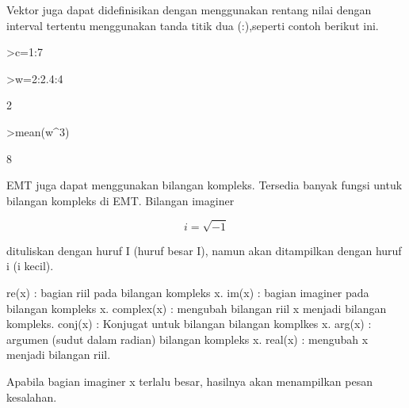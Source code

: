 \documentclass[a4paper,10pt]{article}
\begin{document}
\begin{eulernotebook}
\begin{eulercomment}
\begin{eulercomment}
\begin{eulercomment}
\begin{eulercomment}
\begin{eulercomment}
Vektor juga dapat didefinisikan dengan menggunakan rentang nilai dengan interval
tertentu menggunakan tanda titik dua (:),seperti contoh berikut ini.
\end{eulercomment}
\begin{eulerprompt}
>c=1:7
\end{eulerprompt}
\begin{euleroutput}
  [1,  2,  3,  4,  5,  6,  7]
\end{euleroutput}
\begin{eulerprompt}
>w=2:2.4:4
\end{eulerprompt}
\begin{euleroutput}
  2
\end{euleroutput}
\begin{eulerprompt}
>mean(w^3)
\end{eulerprompt}
\begin{euleroutput}
  8
\end{euleroutput}
\begin{eulercomment}
EMT juga dapat menggunakan bilangan kompleks. Tersedia banyak fungsi untuk
bilangan kompleks di EMT. Bilangan imaginer

\end{eulercomment}
\begin{eulerformula}
\[
i = \sqrt{-1}
\]
\end{eulerformula}
\begin{eulercomment}
dituliskan dengan huruf I (huruf besar I), namun akan ditampilkan dengan huruf i
(i kecil).

\end{eulercomment}
\begin{eulerttcomment}
  re(x) : bagian riil pada bilangan kompleks x.
  im(x) : bagian imaginer pada bilangan kompleks x.
  complex(x) : mengubah bilangan riil x menjadi bilangan kompleks.
  conj(x) : Konjugat untuk bilangan bilangan komplkes x.
  arg(x) : argumen (sudut dalam radian) bilangan kompleks x.
  real(x) : mengubah x menjadi bilangan riil.
\end{eulerttcomment}
\begin{eulercomment}

Apabila bagian imaginer x terlalu besar, hasilnya akan menampilkan pesan
kesalahan.


\end{eulercomment}
\end{eulercomment}
\end{eulercomment}
\end{eulercomment}
\end{eulercomment}
\end{eulernotebook}
\end{document}
